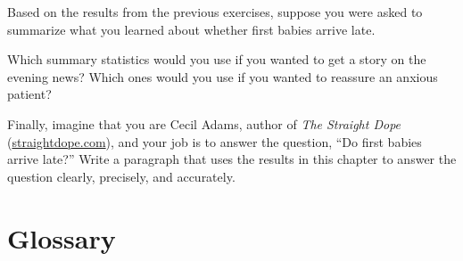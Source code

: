 \documentclass[12pt]{book}
\begin{document}
\begin{exercise}
Based on the results from the previous exercises, suppose you were
asked to summarize what you learned about whether first
babies arrive late.

Which summary statistics would you use if you wanted to get a story
on the evening news?  Which ones would you use if you wanted to
reassure an anxious patient?


Finally, imagine that you are Cecil Adams, author of {\it The Straight
  Dope} (\url{straightdope.com}), and your job is to answer the
question, ``Do first babies arrive late?''  Write a paragraph that
uses the results in this chapter to answer the question clearly,
precisely, and accurately.

\end{exercise}



\section{Glossary}
\end{document}
